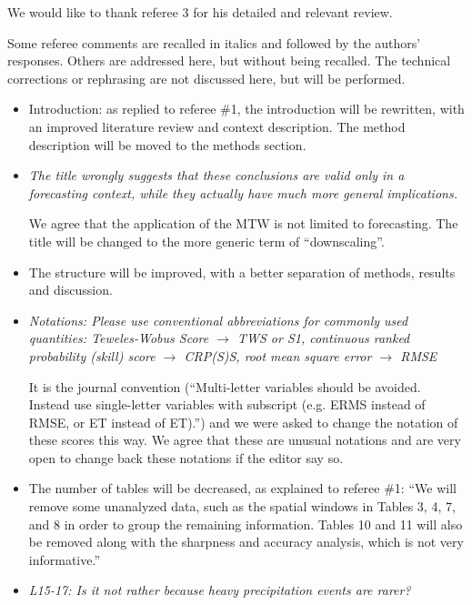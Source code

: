 \documentclass[]{letter}
\begin{document}
We would like to thank referee 3 for his detailed and relevant review.

Some referee comments are recalled in italics and followed by the authors’ responses. Others are addressed here, but without being recalled. The technical corrections or rephrasing are not discussed here, but will be performed.

\begin{itemize}
	
	\item Introduction: as replied to referee \#1, the introduction will be rewritten, with an improved literature review and context description. The method description will be moved to the methods section. 
	
	\item \textit{The title wrongly suggests that these conclusions are valid only in a forecasting context, while they actually have much more general implications.}
	
	We agree that the application of the MTW is not limited to forecasting. The title will be changed to the more generic term of “downscaling”. 
	
	\item The structure will be improved, with a better separation of methods, results and discussion.
	
	\item \textit{Notations: Please use conventional abbreviations for commonly used quantities: Teweles-Wobus Score $\rightarrow$ TWS or S1, continuous ranked probability (skill) score $\rightarrow$ CRP(S)S, root mean square error $\rightarrow$ RMSE}
	
	It is the journal convention (“Multi-letter variables should be avoided. Instead use single-letter variables with subscript (e.g. ERMS instead of RMSE, or ET instead of ET).”) and we were asked to change the notation of these scores this way. We agree that these are unusual notations and are very open to change back these notations if the editor say so. 
	
	\item The number of tables will be decreased, as explained to referee \#1: “We will remove some unanalyzed data, such as the spatial windows in Tables 3, 4, 7, and 8 in order to group the remaining information. Tables 10 and 11 will also be removed along with the sharpness and accuracy analysis, which is not very informative.”
	
	\item \textit{L15-17: Is it not rather because heavy precipitation events are rarer?}
	

\end{itemize}
\end{document}
